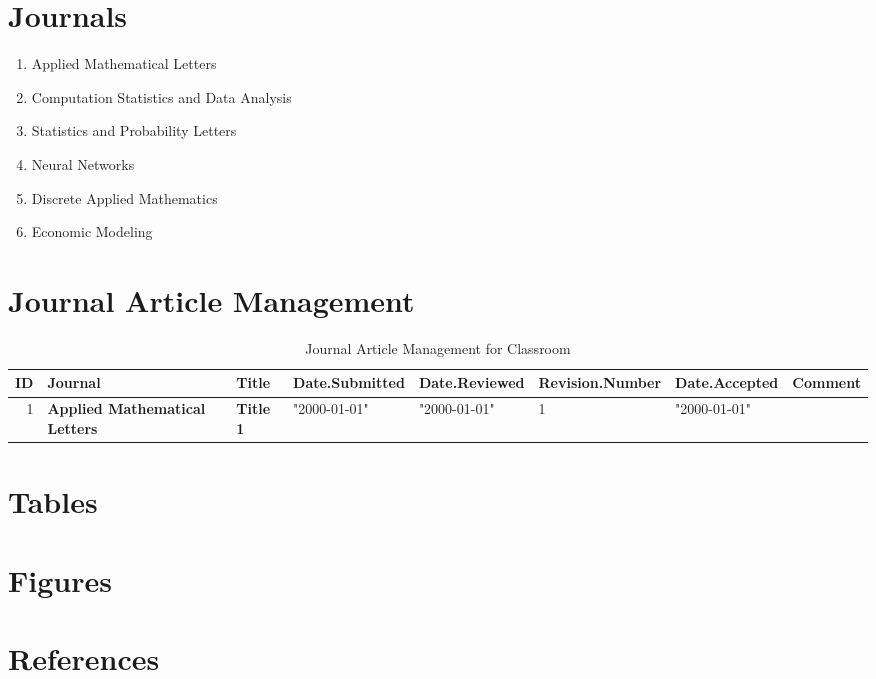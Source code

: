 

\section{Journals}

\begin{enumerate}
\item Applied Mathematical Letters \cite{key1}
\item Computation Statistics and Data Analysis \cite{key2}
\item Statistics and Probability Letters \cite{key3}
\item Neural Networks \cite{key4}
\item Discrete Applied Mathematics \cite{key5}
\item Economic Modeling \cite{key6}
\end{enumerate}


\section{Journal Article Management}


\begin{table}[ht]
\caption{Journal Article Management for Classroom}
\begin{tabular}{rlllllll}
\hline
ID & Journal & Title & Date.Submitted & Date.Reviewed & Revision.Number & Date.Accepted & Comment \\
\hline
1 & \textbf{Applied Mathematical Letters} \cite{key1} & \textbf{Title 1} & "2000-01-01" & "2000-01-01" & 1 & "2000-01-01" & \\
\hline
\end{tabular}
\end{table}


\section{Tables}


\section{Figures}



\section{References}

